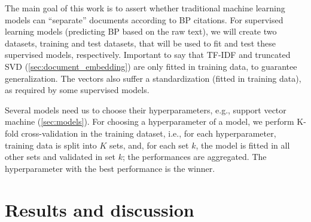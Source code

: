 \documentclass[twocolumn]{article}
\begin{document}
                  The main goal of this work is to assert whether traditional machine learning models can ``separate'' documents according to BP citations. For supervised learning models (predicting BP based on the raw text), we will create two datasets, training and test datasets, that will be used to fit and test these supervised models, respectively. Important to say that TF-IDF and truncated SVD (\autoref{sec:document_embedding}) are only fitted in training data, to guarantee generalization. The vectors also suffer a standardization (fitted in training data), as required by some supervised models.

                  Several models need us to choose their hyperparameters, e.g., support vector machine (\autoref{sec:models}). For choosing a hyperparameter of a model, we perform K-fold cross-validation in the training dataset, i.e., for each hyperparameter, training data is split into $K$ sets, and, for each set $k$, the model is fitted in all other sets and validated in set $k$; the performances are aggregated. The hyperparameter with the best performance is the winner.

      \section{Results and discussion}
            \label{sec:results}

      \nocite{*}
      
      
\end{document}
